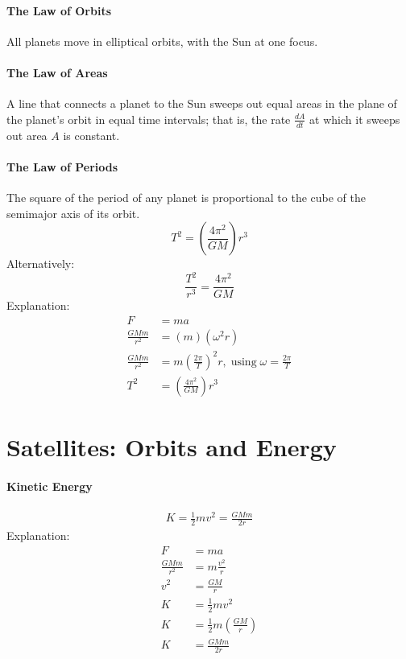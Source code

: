 \documentclass{article}
\begin{document}
        \paragraph{The Law of Orbits}
        All planets move in elliptical orbits, with the Sun at one focus.

        \paragraph{The Law of Areas}
        A line that connects a planet to the Sun sweeps out equal areas in the plane of the planet's orbit in equal time intervals; that is, the rate $\frac{dA}{dt}$ at which it sweeps out area $A$ is constant.

        \paragraph{The Law of Periods}
        The square of the period of any planet is proportional to the cube of the semimajor axis of its orbit.
        \begin{equation}
            T^2 = \left( \frac{4 \pi^2}{G M} \right) r^3
        \end{equation}
        Alternatively:
        \begin{equation}
            \frac{T^2}{r^3} = \frac{4 \pi^2}{G M}
        \end{equation}
        Explanation:
        \begin{align}
            F &= m a \nonumber\\
            \frac{G M m}{r^2} &= \left( m \right) \left( \omega^2 r \right) \nonumber\\
            \frac{G M m}{r^2} &= m {\left( \frac{2 \pi}{T} \right)}^2 r, \; \text{using} \; \omega = \frac{2 \pi}{T} \nonumber\\
            T^2 &= \left( \frac{4 \pi^2}{G M} \right) r^3 \nonumber
        \end{align}

    \section{Satellites: Orbits and Energy}

        \paragraph{Kinetic Energy}
        \begin{eqnarray}
            K = \frac{1}{2} m v^2 = \frac{G M m}{2r}
        \end{eqnarray}
        Explanation:
        \begin{align}
            F &= m a \nonumber\\
            \frac{G M m}{r^2} &= m \frac{v^2}{r} \nonumber\\
            v^2 &= \frac{G M}{r} \nonumber\\
            K &= \frac{1}{2} m v^2 \nonumber\\
            K &= \frac{1}{2} m \left( \frac{G M}{r} \right) \nonumber\\
            K &= \frac{G M m}{2 r} \nonumber
        \end{align}
\end{document}
